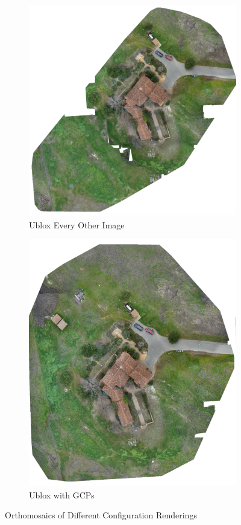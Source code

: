 \documentclass{article}
\begin{document}
\begin{figure}
\begin{subfigure}{.33\textwidth}
  \includegraphics[width=.72\linewidth]{images/orthomosaics/ublox_every_other_image.png}
  \caption{Ublox Every Other Image}
  \label{fig:sub1}
\end{subfigure}%
\begin{subfigure}{.33\textwidth}
  \centering
  \includegraphics[width=.72\linewidth]{images/orthomosaics/ublox_gcp.png}
  \caption{Ublox with GCPs}
  \label{fig:sub1}
\end{subfigure}%
\caption{Orthomosaics of Different Configuration Renderings}
\label{ortho}
\end{figure}
\end{document}
